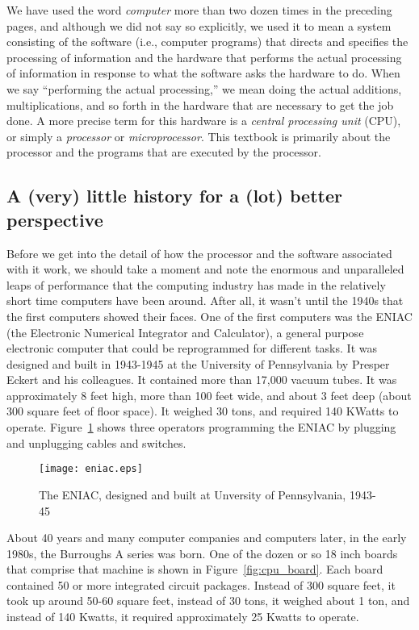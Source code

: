 \documentclass{patt}
\begin{document}
We have used the word {\em computer} more than two dozen times in the
preceding pages, and although we did not say so explicitly,
we used it to mean a system consisting of the software (i.e., computer programs)
that directs 
and specifies the processing of information and the hardware that performs the 
actual processing of information in response to what the software asks the
hardware to do.  When we say ``performing the actual processing,'' we mean 
doing the actual additions, multiplications, and so forth in the hardware 
that are necessary to get the job done. A more precise term for this
hardware is a {\em central processing unit} (CPU), or simply a
{\em processor} or {\em microprocessor}.  This textbook is primarily about 
the processor and the programs that are executed by the processor.

\subsection{A (very) little history for a (lot) better perspective}

Before we get into the detail of how the processor and the software
associated with it work, we should take a moment and note the enormous and
unparalleled leaps of performance that the computing industry has made in the
relatively short time computers have been around.  After all, it wasn't until
the 1940s that the first computers showed their faces.  One of the first 
computers was the ENIAC (the Electronic Numerical Integrator and Calculator), 
a general purpose electronic computer that could be reprogrammed for different 
tasks.  It was designed  and built in 1943-1945 at the University of 
Pennsylvania by Presper Eckert and his colleagues.  It contained more than 
17,000 vacuum tubes.  It was approximately 8 feet high, more than 100 feet wide,
and about 3 feet deep (about 300 square feet of floor space).  It weighed 
30 tons, and required 140 KWatts to operate.  Figure~\ref{fig:eniac} shows 
three operators programming the ENIAC by plugging and unplugging cables 
and switches.

\begin{figure}[b]
\vspace{2pt}
\centerline{\texttt{[image: eniac.eps]}}
\caption{The ENIAC, designed and built at Unversity of Pennsylvania, 1943-45}
\label{fig:eniac}
\end{figure}


\FloatBarrier
About 40 years and many computer companies and computers later, in the early 
1980s, the Burroughs A series was born.  One of the dozen or so 18 inch boards 
that comprise that machine is shown in 
Figure~\ref{fig:cpu_board}.  Each board contained 50 or more integrated 
circuit packages.  Instead of 300 square feet, it took up around 50-60 square 
feet, instead of 30 tons, it weighed about 1 ton, and instead of 140 Kwatts,
it required approximately 25 Kwatts to operate.
\end{document}
